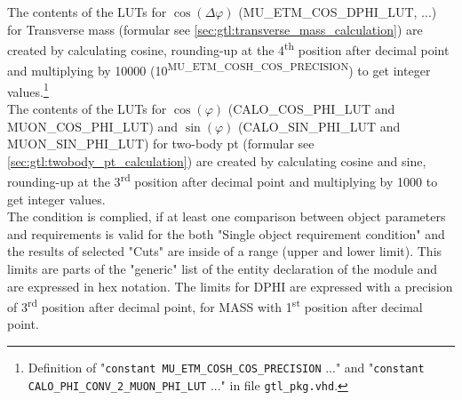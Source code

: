 The contents of the LUTs for $\cos(\Delta\varphi)$ (\small{MU\_ETM\_COS\_DPHI\_LUT}\normalsize, ...) for Transverse mass (formular see \ref{sec:gtl:transverse_mass_calculation}) 
are created by calculating cosine, rounding-up at the 4\textsuperscript{th} 
position after decimal point and multiplying by 10000 (10\textsuperscript{\tiny{MU\_ETM\_COSH\_COS\_PRECISION}}\normalsize) to get integer values.\footnote{Definition of 
"\texttt{constant \small{MU\_ETM\_COSH\_COS\_PRECISION}\normalsize} ..." and "\texttt{constant \small{CALO\_PHI\_CONV\_2\_MUON\_PHI\_LUT}\normalsize} ..." in file \texttt{gtl\_pkg.vhd}.}\\
The contents of the LUTs for $\cos(\varphi)$ (\small{CALO\_COS\_PHI\_LUT and MUON\_COS\_PHI\_LUT}\normalsize) and $\sin(\varphi)$ (\small{CALO\_SIN\_PHI\_LUT and MUON\_SIN\_PHI\_LUT}\normalsize) for two-body pt 
(formular see \ref{sec:gtl:twobody_pt_calculation}) are created by calculating cosine and sine, rounding-up at the 3\textsuperscript{rd} position after decimal point and multiplying by 1000 to get integer values.\\
The condition is complied, if at least one comparison between object parameters and requirements is valid for the both "Single object requirement condition"
and the results of selected "Cuts" are inside of a range (upper and lower limit).
This limits are parts of the "generic" list of the entity declaration of the module and are expressed in hex notation. The limits for DPHI
are expressed with a precision of 3\textsuperscript{rd} position after decimal point, for MASS with 1\textsuperscript{st} position after decimal point.

